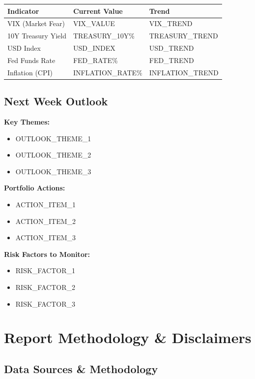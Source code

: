 \documentclass[11pt]{article}
\begin{document}
\begin{center}
\begin{tabularx}{\textwidth}{|X|X|X|}
\hline
\rowcolor{bullish!15}
\textbf{Indicator} & \textbf{Current Value} & \textbf{Trend} \\
\hline
VIX (Market Fear) & {{VIX_VALUE}} & {{VIX_TREND}} \\
10Y Treasury Yield & {{TREASURY_10Y}}\% & {{TREASURY_TREND}} \\
USD Index & {{USD_INDEX}} & {{USD_TREND}} \\
Fed Funds Rate & {{FED_RATE}}\% & {{FED_TREND}} \\
Inflation (CPI) & {{INFLATION_RATE}}\% & {{INFLATION_TREND}} \\
\hline
\end{tabularx}
\end{center}

\subsection{Next Week Outlook}

\textbf{Key Themes:}
\begin{itemize}
    \item {{OUTLOOK_THEME_1}}
    \item {{OUTLOOK_THEME_2}}
    \item {{OUTLOOK_THEME_3}}
\end{itemize}

\textbf{Portfolio Actions:}
\begin{itemize}
    \item {{ACTION_ITEM_1}}
    \item {{ACTION_ITEM_2}}
    \item {{ACTION_ITEM_3}}
\end{itemize}

\textbf{Risk Factors to Monitor:}
\begin{itemize}
    \item {{RISK_FACTOR_1}}
    \item {{RISK_FACTOR_2}}
    \item {{RISK_FACTOR_3}}
\end{itemize}

\section{Report Methodology \& Disclaimers}

\subsection{Data Sources \& Methodology}
\end{document}
